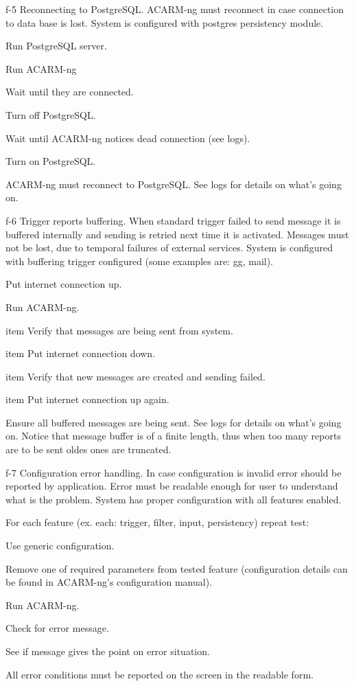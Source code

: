 \testCase
{f-5}
{Reconnecting to PostgreSQL.}
{ACARM-ng must reconnect in case connection to data base is lost.}
{System is configured with postgres persistency module.}
{
\begin{enumerate*}
\item Run PostgreSQL server.
\item Run ACARM-ng
\item Wait until they are connected.
\item Turn off PostgreSQL.
\item Wait until ACARM-ng notices dead connection (see logs).
\item Turn on PostgreSQL.
\end{enumerate*}
}
{ACARM-ng must reconnect to PostgreSQL.}
{See logs for details on what's going on.}


\testCase
{f-6}
{Trigger reports buffering.}
{When standard trigger failed to send message it is buffered internally and sending is retried next time it is activated. Messages must not be lost, due to temporal failures of external services.}
{System is configured with buffering trigger configured (some examples are: gg, mail).}
{
\begin{enumerate*}
\item Put internet connection up.
\item Run ACARM-ng.
\item item Verify that messages are being sent from system.
\item item Put internet connection down.
\item item Verify that new messages are created and sending failed.
\item item Put internet connection up again.
\end{enumerate*}
}
{Ensure all buffered messages are being sent.}
{See logs for details on what's going on. Notice that message buffer is of a finite length, thus when too many reports are to be sent oldes ones are truncated.}


\testCase
{f-7}
{Configuration error handling.}
{In case configuration is invalid error should be reported by application. Error must be readable enough for user to understand what is the problem.}
{System has proper configuration with all features enabled.}
{
For each feature (ex. each: trigger, filter, input, persistency) repeat test:
\begin{enumerate*}
\item Use generic configuration.
\item Remove one of required parameters from tested feature (configuration details can be found in ACARM-ng's configuration manual).
\item Run ACARM-ng.
\item Check for error message.
\item See if message gives the point on error situation.
\end{enumerate*}
}
{All error conditions must be reported on the screen in the readable form.}
{}


